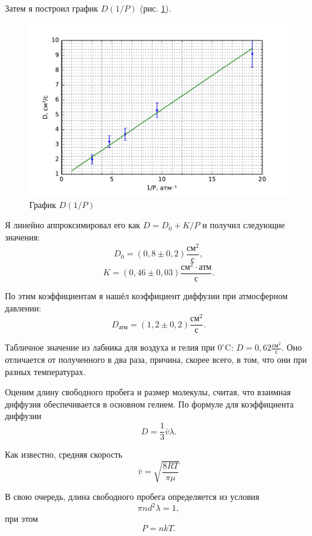 \documentclass[12pt]{article}
\newcommand{\degC}{^\circ \text{C}}
\newcommand{\fref}[1]{рис. \ref{#1}}
\begin{document}
	Затем я построил график $D(1/P)$ (\fref{graph-DP}).
	
	\begin{figure}[!h]
		\caption{График $D(1/P)$}
		\begin{center}
		\includegraphics[scale=.8]{graph-DP.pdf}
		\end{center}
		\label{graph-DP}
	\end{figure}
	
	Я линейно аппроксимировал его как $D=D_0+K/P$ и получил следующие значения: $$ D_0=(0{,}8\pm 0{,}2) \frac{\text{см}^2}{\text{с}}, $$ $$ K=(0{,}46\pm 0{,}03) \frac{\text{см}^2 \cdot \text{атм}}{\text{с}}. $$
	
	По этим коэффициентам я нашёл коэффициент диффузии при атмосферном давлении: $$ D_\text{атм}=(1{,}2\pm 0{,}2) \frac{\text{см}^2}{\text{с}}. $$
	
	Табличное значение из лабника для воздуха и гелия при $0\degC$: $D=0{,}62 \frac{\text{см}^2}{\text{с}}$. Оно отличается от полученного в два раза, причина, скорее всего, в том, что они при разных температурах.
	
	Оценим длину свободного пробега и размер молекулы, считая, что взаимная диффузия обеспечивается в основном гелием.
	По формуле для коэффициента диффузии
	\begin{equation}
		\label{eq:diff_co_fla}
		D=\frac{1}{3} \bar{v} \lambda.
	\end{equation}
	
	Как известно, средняя скорость
	\begin{equation}
		\label{eq:v_avg}
		\bar{v} = \sqrt{\frac{8RT}{\pi \mu}}
	\end{equation}
	
	В свою очередь, длина свободного пробега определяется из условия
	\begin{equation}
		\label{eq:lambda_fla}
		\pi n d^2 \lambda=1,
	\end{equation}
	при этом
	\begin{equation}
		\label{eq:press_fla}
		P=nkT.
	\end{equation}
	
\end{document}
